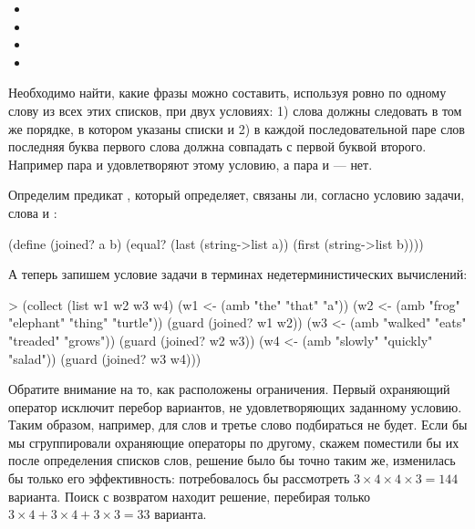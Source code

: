 \begin{itemize}
  \item {}
  \item {}
  \item {}
  \item {}
\end{itemize}

Необходимо найти, какие фразы можно составить, используя ровно по одному слову из всех этих списков, при двух условиях: 1) слова должны следовать в том же порядке, в котором указаны списки и 2) в каждой последовательной паре слов последняя буква первого слова должна совпадать с первой буквой второго. Например пара  и  удовлетворяют этому условию, а пара  и  --- нет. 

Определим предикат , который определяет, связаны ли, согласно условию задачи, слова  и :
\begin{SchemeCode}[emph={a,b}]
(define (joined? a b)
  (equal? (last (string->list a)) 
          (first (string->list b))))
\end{SchemeCode}

А теперь запишем условие задачи в терминах недетерминистических вычислений:

\begin{SchemeCode}[emph={w1,w2,w3,w4}]
> (collect (list w1 w2 w3 w4)
    (w1 <- (amb "the" "that" "a"))
    (w2 <- (amb "frog" "elephant" "thing" "turtle"))
    (guard (joined? w1 w2))
    (w3 <- (amb "walked" "eats" "treaded" "grows"))
    (guard (joined? w2 w3))
    (w4 <- (amb "slowly" "quickly" "salad"))
    (guard (joined? w3 w4)))%
\end{SchemeCode}

Обратите внимание на то, как расположены ограничения. Первый охраняющий оператор  исключит перебор вариантов, не удовлетворяющих заданному условию. Таким образом, например, для слов  и  третье слово подбираться не будет. Если бы мы сгруппировали охраняющие операторы по другому, скажем поместили бы их после определения списков слов, решение было бы точно таким же, изменилась бы только его эффективность: потребовалось бы рассмотреть $3\times4\times4\times3=144$ варианта. Поиск с возвратом находит решение, перебирая только $3\times4+3\times4+3\times3=33$ варианта.


